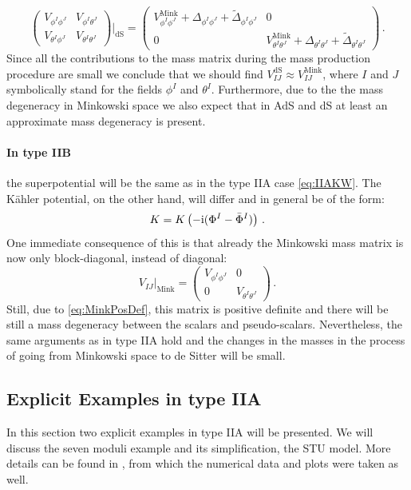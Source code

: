 \documentclass[a4paper,12pt]{report}
\newcommand{\be}{\begin{equation}}
\newcommand{\ee}{\end{equation}}
\def\rmi{{\rm i}}
\begin{document}
\be 
\begin{pmatrix}
V_{\phi^I\phi^J} & V_{\phi^I \theta^J}\\
V_{\theta^I\phi^J} & V_{\theta^I \theta^J}
\end{pmatrix}\Bigg|_{\text{dS}}
=
\begin{pmatrix}
V^{\text{Mink}}_{\phi^I\phi^J} + \Delta_{\phi^I \phi^J}+ \tilde{\Delta}_{\phi^I \phi^J}& 0\\
0 & V^{\text{Mink}}_{\theta^I \theta^J}+\Delta_{\theta^I \theta^J}+\tilde{\Delta}_{\theta^I \theta^J}
\end{pmatrix}\,.
\ee
Since all the contributions to the mass matrix during the mass production procedure are small we conclude that we should find $V^{\text{dS}}_{IJ} \approx V^{\text{Mink}}_{IJ}$, where $I$ and $J$ symbolically stand for the fields $\phi^I$ and $\theta^I$. Furthermore, due to the the mass degeneracy in Minkowski space we also expect that in AdS and dS at least an approximate mass degeneracy is present.
\paragraph{In type IIB} the superpotential will be the same as in the type IIA case \eqref{eq:IIAKW}. The Kähler potential, on the other hand, will differ and in general be of the form:
\be 
K = K\left(-\rmi ( \Phi^I - \bar{\Phi}^I )\right)\,.
\ee 
One immediate consequence of this is that already the Minkowski mass matrix is now only block-diagonal, instead of diagonal:
\be 
V_{IJ}|_{\text{Mink}}=
\begin{pmatrix}
V_{\phi^I\phi^J} & 0\\
0 & V_{\theta^I \theta^J}
\end{pmatrix}\,.
\ee
Still, due to \eqref{eq:MinkPosDef}, this matrix is positive definite and there will be still a mass degeneracy between the scalars and pseudo-scalars. Nevertheless, the same arguments as in type IIA hold and the changes in the masses in the process of going from Minkowski space to de Sitter will be small.

\subsection{Explicit Examples in type IIA}
\label{sec:massIIAexampel}
In this section two explicit examples in type IIA will be presented. We will discuss the seven moduli example and its simplification, the STU model. More details can be found in \cite{Cribiori:2019drf}, from which the numerical data and plots were taken as well.
\end{document}
